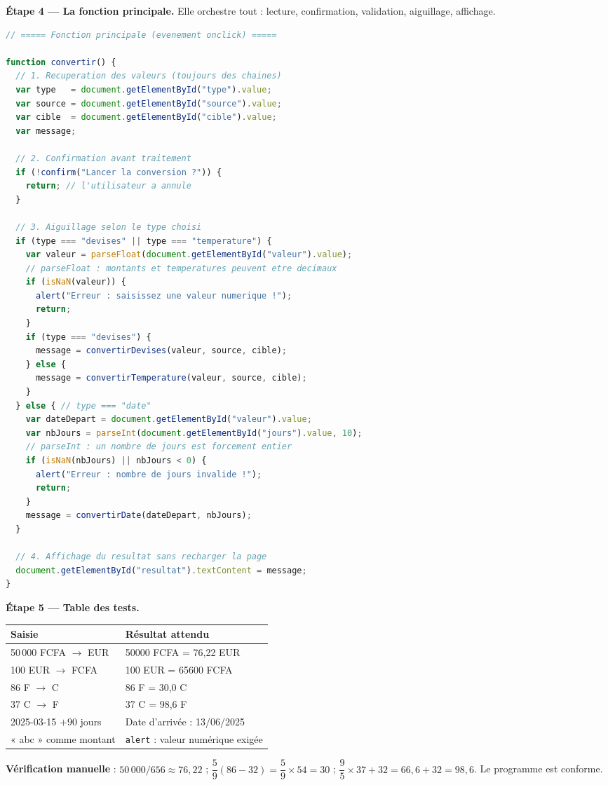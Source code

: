 \documentclass[11pt]{article}
\begin{document}
\begin{exoresolu}
\textbf{Étape 4 — La fonction principale.} Elle orchestre tout : lecture, confirmation, validation, aiguillage, affichage.

\begin{lstlisting}[language=JavaScript]
// ===== Fonction principale (evenement onclick) =====

function convertir() {
  // 1. Recuperation des valeurs (toujours des chaines)
  var type   = document.getElementById("type").value;
  var source = document.getElementById("source").value;
  var cible  = document.getElementById("cible").value;
  var message;

  // 2. Confirmation avant traitement
  if (!confirm("Lancer la conversion ?")) {
    return; // l'utilisateur a annule
  }

  // 3. Aiguillage selon le type choisi
  if (type === "devises" || type === "temperature") {
    var valeur = parseFloat(document.getElementById("valeur").value);
    // parseFloat : montants et temperatures peuvent etre decimaux
    if (isNaN(valeur)) {
      alert("Erreur : saisissez une valeur numerique !");
      return;
    }
    if (type === "devises") {
      message = convertirDevises(valeur, source, cible);
    } else {
      message = convertirTemperature(valeur, source, cible);
    }
  } else { // type === "date"
    var dateDepart = document.getElementById("valeur").value;
    var nbJours = parseInt(document.getElementById("jours").value, 10);
    // parseInt : un nombre de jours est forcement entier
    if (isNaN(nbJours) || nbJours < 0) {
      alert("Erreur : nombre de jours invalide !");
      return;
    }
    message = convertirDate(dateDepart, nbJours);
  }

  // 4. Affichage du resultat sans recharger la page
  document.getElementById("resultat").textContent = message;
}
\end{lstlisting}

\textbf{Étape 5 — Table des tests.}

\begin{center}
\begin{tabularx}{\linewidth}{|l|X|}
\hline
\rowcolor{popblueL} \textbf{Saisie} & \textbf{Résultat attendu} \\
\hline
50\,000 FCFA $\rightarrow$ EUR & 50000 FCFA = 76,22 EUR \\
\hline
100 EUR $\rightarrow$ FCFA & 100 EUR = 65600 FCFA \\
\hline
86 F $\rightarrow$ C & 86 F = 30,0 C \\
\hline
37 C $\rightarrow$ F & 37 C = 98,6 F \\
\hline
2025-03-15 $+ 90$ jours & Date d'arrivée : 13/06/2025 \\
\hline
« abc » comme montant & \texttt{alert} : valeur numérique exigée \\
\hline
\end{tabularx}
\end{center}

\textbf{Vérification manuelle} : $50\,000 / 656 \approx 76,22$ ; $\dfrac{5}{9}(86-32) = \dfrac{5}{9}\times 54 = 30$ ; $\dfrac{9}{5}\times 37 + 32 = 66{,}6 + 32 = 98{,}6$. Le programme est conforme.
\end{exoresolu}
\end{document}
